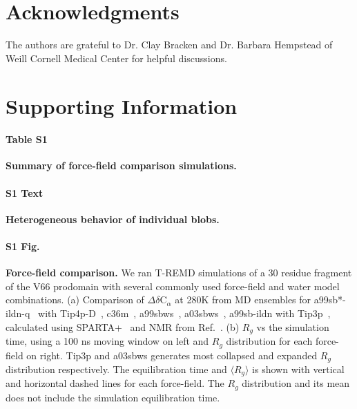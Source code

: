 \documentclass[10pt,letterpaper]{article}
\begin{document}
\section*{Acknowledgments}
The authors are grateful to Dr. Clay Bracken and Dr. Barbara Hempstead of Weill Cornell Medical Center for helpful discussions.

\section*{Supporting Information}



\paragraph*{Table S1}
\label{S1_Table}
{\bf Summary of force-field comparison simulations.}

\paragraph*{S1 Text}
\label{S1_Text}
{\bf Heterogeneous behavior of individual blobs.} 

\paragraph*{S1 Fig.}
\label{S1_Fig}
{\bf Force-field comparison.} We ran T-REMD simulations of a 30 residue fragment of the V66 prodomain with several commonly used force-field and water model combinations. (a) Comparison of $\Delta$$\delta$C$_{\alpha}$ at 280K from MD ensembles for a99sb*-ildn-q~\cite{Lindorff-Larsen2010a, Hornak2006a} with Tip4p-D~\cite{Piana2015}, c36m~\cite{Huang2016a}, a99sbws~\cite{Lindorff-Larsen2010a, Best2014}, a03sbws~\cite{Best2009, Best2014}, a99sb-ildn with Tip3p~\cite{Jorgensen1981}, calculated using SPARTA+~\cite{Shen2010} and NMR from Ref.~\cite{Anastasia2013}. (b) $R_g$ vs the simulation time, using a 100 ns moving window on left and $R_g$ distribution for each force-field on right. Tip3p and a03sbws generates most collapsed and expanded $R_g$ distribution respectively. The equilibration time and $\langle R_g \rangle$ is shown with vertical and horizontal dashed lines for each force-field. The $R_g$ distribution and its mean does not include the simulation equilibration time.
\end{document}
